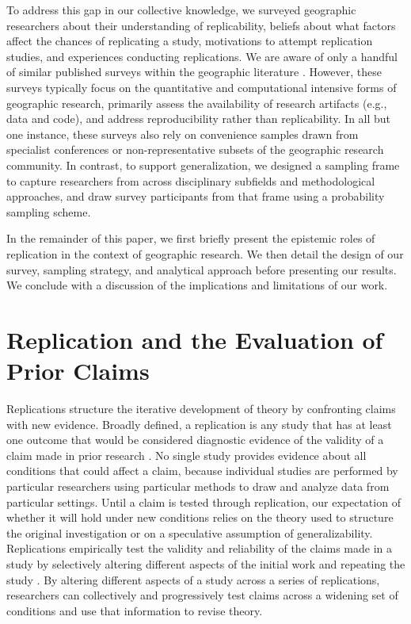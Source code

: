 \documentclass[]{interact}
\theoremstyle{plain}%
\theoremstyle{definition}
\theoremstyle{remark}
\begin{document}
To address this gap in our collective knowledge, we surveyed geographic researchers about their understanding of replicability, beliefs about what factors affect the chances of replicating a study, motivations to attempt replication studies, and experiences conducting replications.
We are aware of only a handful of similar published surveys within the geographic literature \citep{balz2020reproducibility, konkol2019, ostermann2017, kedron2023survey}.
However, these surveys typically focus on the quantitative and computational intensive forms of geographic research, primarily assess the availability of research artifacts (e.g., data and code), and address reproducibility rather than replicability. 
In all but one instance, these surveys also rely on convenience samples drawn from specialist conferences or non-representative subsets of the geographic research community. 
In contrast, to support generalization, we designed a sampling frame to capture researchers from across disciplinary subfields and methodological approaches, and draw survey participants from that frame using a probability sampling scheme.

In the remainder of this paper, we first briefly present the epistemic roles of replication in the context of geographic research.
We then detail the design of our survey, sampling strategy, and analytical approach before presenting our results. 
We conclude with a discussion of the implications and limitations of our work. 


\section*{Replication and the Evaluation of Prior Claims}
Replications structure the iterative development of theory by confronting claims with new evidence.
Broadly defined, a replication is any study that has at least one outcome that would be considered diagnostic evidence of the validity of a claim made in prior research \citep{nosek2020}.
No single study provides evidence about all conditions that could affect a claim, because individual studies are performed by particular researchers using particular methods to draw and analyze data from particular settings. 
Until a claim is tested through replication, our expectation of whether it will hold under new conditions relies on the theory used to structure the original investigation or on a speculative assumption of generalizability.
Replications empirically test the validity and reliability of the claims made in a study by selectively altering different aspects of the initial work and repeating the study \citep{schmidt2009, gomez2010replications, radder2003, radder2012}.  
By altering different aspects of a study across a series of replications, researchers can collectively and progressively test claims across a widening set of conditions and use that information to revise theory.
\end{document}
